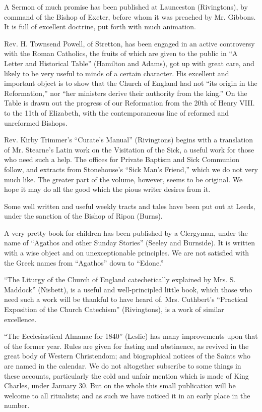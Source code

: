 A Sermon of much promise has been published at
Launceston (Rivingtons), by command of the Bishop of Exeter, before whom
it was preached by Mr. Gibbons. It is full of excellent doctrine, put
forth with much animation.

Rev. H. Townsend Powell, of Stretton, has been
engaged in an active controversy with the Roman Catholics, the fruits of
which are given to the public in ``A Letter and Historical Table''
(Hamilton and Adams), got up with great care, and likely to be very
useful to minds of a certain character. His excellent and important
object is to show that the Church of England had not ``its origin in
the Reformation,'' nor ``her ministers derive their authority from the
king.'' On the Table is drawn out the progress of our Reformation from
the 20th of Henry VIII. to the 11th of Elizabeth, with the
contemporaneous line of reformed and unreformed Bishops.

Rev. Kirby Trimmer's ``Curate's Manual'' (Rivingtons)
begins with a translation of Mr. Stearne's Latin work on the
Visitation of the Sick, a useful work for those who need such a help.
The offices for Private Baptism and Sick Communion follow, and extracts
from Stonehouse's ``Sick Man's Friend,'' which we do not very much
like. The greater part of the volume, however, seems to be original. We
hope it may do all the good which the pious writer desires from it.

Some well written and useful weekly tracts and
tales have been put out at Leeds, under the sanction of the Bishop of
Ripon (Burns).

A very pretty book for children has been published
by a Clergyman, under the name of ``Agathos and other Sunday Stories''
(Seeley and Burnside). It is written with a wise object and on
unexceptionable principles. We are not satisfied with the Greek names
from ``Agathos'' down to ``Edone.''

``The Liturgy of the Church of England
catechetically explained by Mrs. S. Maddock'' (Nisbett), is a useful
and well-principled little book, which those who need such a work will
be thankful to have heard of. Mrs. Cuthbert's ``Practical Exposition
of the Church Catechism'' (Rivingtons), is a work of similar
excellence.

``The Ecclesiastical Almanac for 1840'' (Leslie)
has many improvements upon that of the former year. Rules are given for
fasting and abstinence, as revived in the great body of Western
Christendom; and biographical notices of the Saints who are named in the
calendar. We do not altogether subscribe to some things in these
accounts, particularly the cold and unfair mention which is made of King
Charles, under January 30. But on the whole this small publication will
be welcome to all ritualists; and as such we have noticed it in an early
place in the number.

